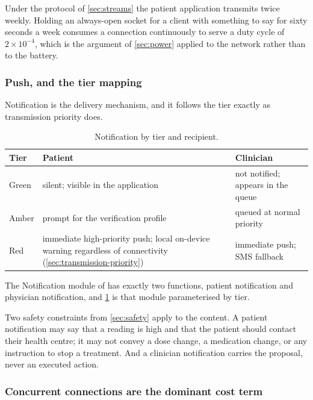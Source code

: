 \documentclass[12pt,a4paper,oneside]{report}
\begin{document}
Under the protocol of \cref{sec:streams} the patient application transmits twice weekly. Holding an always-open socket for a client with something to say for sixty seconds a week consumes a connection continuously to serve a duty cycle of $2\times10^{-4}$, which is the argument of \cref{sec:power} applied to the network rather than to the battery.

\subsubsection{Push, and the tier mapping}

Notification is the delivery mechanism, and it follows the tier exactly as transmission priority does.

\begin{table}[htbp]
\centering\small
\caption{Notification by tier and recipient.}\label{tab:notification}
\begin{tabularx}{\textwidth}{@{}>{\raggedright\arraybackslash}p{1.6cm} X >{\raggedright\arraybackslash}p{4.4cm}@{}}
\toprule
\textbf{Tier} & \textbf{Patient} & \textbf{Clinician} \\
\midrule
Green & silent; visible in the application & not notified; appears in the queue \\
Amber & prompt for the verification profile & queued at normal priority \\
Red & immediate high-priority push; local on-device warning regardless of connectivity (\cref{sec:transmission-priority}) & immediate push; SMS fallback \\
\bottomrule
\end{tabularx}
\end{table}

The Notification module of \textcite{yazdani2018} has exactly two functions, patient notification and physician notification, and \cref{tab:notification} is that module parameterised by tier.

Two safety constraints from \cref{sec:safety} apply to the content. A patient notification may say that a reading is high and that the patient should contact their health centre; it may not convey a dose change, a medication change, or any instruction to stop a treatment. And a clinician notification carries the proposal, never an executed action.

\subsubsection{Concurrent connections are the dominant cost term}\label{sec:connection-cost}
\end{document}
